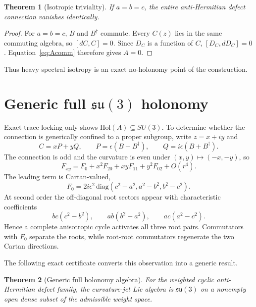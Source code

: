 \documentclass[11pt]{article}
\newtheorem{theorem}{Theorem}
\theoremstyle{remark}\newtheorem{remark}{Remark}
\begin{document}
\begin{theorem}[Isotropic triviality]
If $a=b=c$, the entire anti-Hermitian defect connection vanishes identically.
\end{theorem}

\begin{proof}
For $a=b=c$, $B$ and $B^\dagger$ commute. Every $C(z)$ lies in the same commuting algebra, so $[dC,C]=0$. Since $D_C$ is a function of $C$, $[D_C,dD_C]=0$. Equation~\eqref{eq:Acomm} therefore gives $A=0$.
\end{proof}

Thus heavy spectral isotropy is an exact no-holonomy point of the construction.

\section{Generic full $\mathfrak{su}(3)$ holonomy}
Exact trace locking only shows $\mathrm{Hol}(A)\subseteq SU(3)$. To determine whether the connection is generically confined to a proper subgroup, write $z=x+iy$ and
\begin{equation}
C=xP+yQ,
\qquad P=\epsilon(B-B^\dagger),\qquad Q=i\epsilon(B+B^\dagger).
\end{equation}
The connection is odd and the curvature is even under $(x,y)\mapsto(-x,-y)$, so
\begin{equation}
F_{xy}=F_0+x^2F_{20}+xyF_{11}+y^2F_{02}+O(r^4).
\end{equation}
The leading term is Cartan-valued,
\begin{equation}
F_0=2i\epsilon^2\,\mathrm{diag}(c^2-a^2,a^2-b^2,b^2-c^2).
\end{equation}
At second order the off-diagonal root sectors appear with characteristic coefficients
\begin{equation}
bc(c^2-b^2),\qquad ab(b^2-a^2),\qquad ac(a^2-c^2).
\end{equation}
Hence a complete anisotropic cycle activates all three root pairs. Commutators with $F_0$ separate the roots, while root-root commutators regenerate the two Cartan directions.

The following exact certificate converts this observation into a generic result.

\begin{theorem}[Generic full holonomy algebra]
For the weighted cyclic anti-Hermitian defect family, the curvature-jet Lie algebra is $\mathfrak{su}(3)$ on a nonempty open dense subset of the admissible weight space.
\end{theorem}
\end{document}
